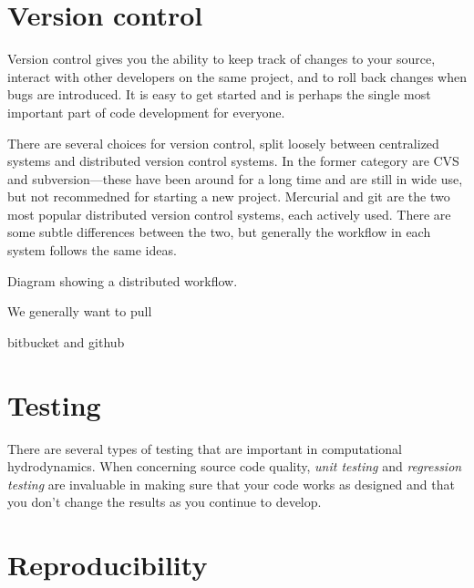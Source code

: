 \section{Version control}

Version control gives you the ability to keep track of changes to your
source, interact with other developers on the same project, and to
roll back changes when bugs are introduced.  It is easy to get started
and is perhaps the single most important part of code development for
everyone.  

There are several choices for version control, split loosely between
centralized systems and distributed version control systems.  In the
former category are CVS and subversion---these have been around for a long
time and are still in wide use, but not recommedned for starting a new project.
Mercurial and git are the two most popular distributed version control
systems, each actively used.  There are some subtle differences between
the two, but generally the workflow in each system follows the same ideas.

Diagram showing a distributed workflow.

We generally want to pull

bitbucket and github




\section{Testing}

There are several types of testing that are important in computational
hydrodynamics.  When concerning source code quality, {\em unit testing}
and {\em regression testing} are invaluable in making sure that your
code works as designed and that you don't change the results as you 
continue to develop.

\section{Reproducibility}

